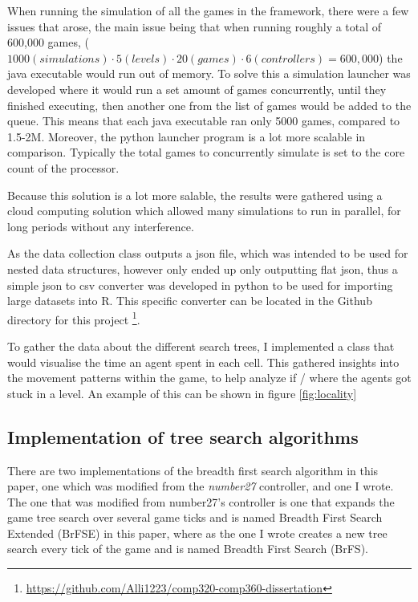 \documentclass[journal]{IEEEtran}
\begin{document}
	When running the simulation of all the games in the framework, there were a few issues that arose, the main issue being that when running roughly a total of 600,000 games, ($ 1000(simulations) \cdot 5 (levels) \cdot 20 (games) \cdot 6 (controllers) = 600,000$) the java executable would run out of memory.
	To solve this a simulation launcher was developed where it would run a set amount of games concurrently, until they finished executing, then another one from the list of games would be added to the queue. This means that each java executable ran only 5000 games, compared to 1.5-2M. Moreover, the python launcher program is a lot more scalable in comparison.
	Typically the total games to concurrently simulate is set to the core count of the processor.

	Because this solution is a lot more salable, the results were gathered using a cloud computing solution which allowed many simulations to run in parallel, for long periods without any interference.
	

	As the data collection class outputs a json file, which was intended to be used for nested data structures, however only ended up only outputting flat json, thus a simple json to csv converter was developed in python to be used for importing large datasets into R. This specific converter can be located in the Github directory for this project \footnote{\url{https://github.com/Alli1223/comp320-comp360-dissertation}}.

	To gather the data about the different search trees, I implemented a class that would visualise the time an agent spent in each cell. 
	This gathered insights into the movement patterns within the game, to help analyze if / where the agents got stuck in a level. An example of this can be shown in figure \ref{fig:locality}

	
	\subsection{Implementation of tree search algorithms} \label{TSImplementation}
	There are two implementations of the breadth first search algorithm in this paper, one which was modified from the \textit{number27} controller, and one I wrote. The one that was modified from number27's controller is one that expands the game tree search over several game ticks and is named Breadth First Search Extended (BrFSE) in this paper, where as the one I wrote creates a new tree search every tick of the game and is named Breadth First Search (BrFS).
	
\end{document}
